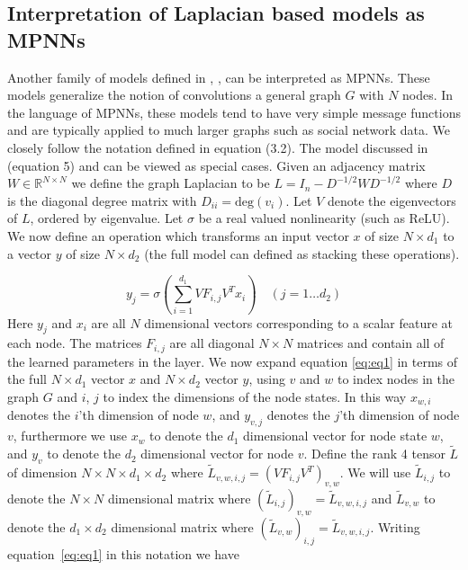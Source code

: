 \documentclass{article}
\begin{document}
\subsection{Interpretation of Laplacian based models as MPNNs}
    Another family of models defined in  \citet{defferrard2016convolutional}, \citet{bruna2013spectral}, \citet{kipf2016} can be interpreted as MPNNs. These models generalize the notion of convolutions a general graph $G$ with $N$ nodes. In the language of MPNNs, these models tend to have very simple message functions and are typically applied to much larger graphs such as social network data.  We closely follow the notation defined in \citet{bruna2013spectral} equation (3.2). The model discussed in \citet{defferrard2016convolutional} (equation 5) and \citet{kipf2016} can be viewed as special cases.  Given an adjacency matrix $W \in \mathbb{R}^{N \times N}$ we define the graph Laplacian to be $L = I_n - D^{-1/2} W D^{-1/2}$ where $D$ is the diagonal degree matrix with $D_{ii} = \textrm{deg}(v_i)$. Let $V$ denote the eigenvectors of $L$, ordered by eigenvalue. Let $\sigma$ be a real valued nonlinearity (such as ReLU). We now define an operation which transforms an input vector $x$ of size $N \times d_1$ to a vector $y$ of size $N \times d_2$ (the full model can defined as stacking these operations). 
    
    \begin{equation} \label{eq:eq1}
        y_j = \sigma \left( \sum\limits_{i=1}^{d_1} V F_{i,j} V^T x_i \right) \quad (j = 1 \ldots d_2)
    \end{equation}
    Here $y_j$ and $x_i$ are all $N$ dimensional vectors corresponding to a scalar feature at each node. The matrices $F_{i,j}$ are all diagonal $N \times N$ matrices and contain all of the learned parameters in the layer. We now expand equation \ref{eq:eq1} in terms of the full $N \times d_1$ vector $x$ and $N \times d_2$ vector $y$, using $v$ and $w$ to index nodes in the graph $G$ and $i$, $j$ to index the dimensions of the node states. In this way $x_{w,i}$ denotes the $i$'th dimension of node $w$, and $y_{v,j}$ denotes the $j$'th dimension of node $v$, furthermore we use $x_w$ to denote the $d_1$ dimensional vector for node state $w$, and $y_v$ to denote the $d_2$ dimensional vector for node $v$. Define the rank 4 tensor $\tilde{L}$ of dimension $N \times N \times d_1 \times d_2$ where $\tilde{L}_{v,w,i,j} = (V F_{i,j} V^T)_{v,w}$. We will use $\tilde{L}_{i,j}$ to denote the $N \times N$ dimensional matrix where  $(\tilde{L}_{i,j})_{v,w} = \tilde{L}_{v,w,i,j}$ and $\tilde{L}_{v,w}$ to denote the $d_1 \times d_2$ dimensional matrix where $(\tilde{L}_{v,w})_{i,j} = \tilde{L}_{v,w,i,j}$. Writing equation~\ref{eq:eq1} in this notation we have
    
\end{document}
